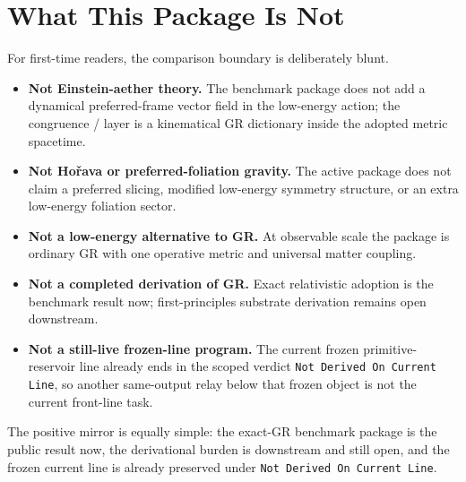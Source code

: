 \section{What This Package Is Not}

For first-time readers, the comparison boundary is deliberately blunt.
\begin{itemize}
    \item \textbf{Not Einstein-aether theory.} The benchmark package does not add a dynamical preferred-frame vector field in the low-energy action; the congruence / \Aflow{} layer is a kinematical GR dictionary inside the adopted metric spacetime.
    \item \textbf{Not Ho\v{r}ava or preferred-foliation gravity.} The active package does not claim a preferred slicing, modified low-energy symmetry structure, or an extra low-energy foliation sector.
    \item \textbf{Not a low-energy alternative to GR.} At observable scale the package is ordinary GR with one operative metric and universal matter coupling.
    \item \textbf{Not a completed derivation of GR.} Exact relativistic adoption is the benchmark result now; first-principles substrate derivation remains open downstream.
    \item \textbf{Not a still-live frozen-line program.} The current frozen primitive-reservoir line already ends in the scoped verdict \texttt{Not Derived On Current Line}, so another same-output relay below that frozen object is not the current front-line task.
\end{itemize}

The positive mirror is equally simple: the exact-GR benchmark package is the public result now, the derivational burden is downstream and still open, and the frozen current line is already preserved under \texttt{Not Derived On Current Line}.
